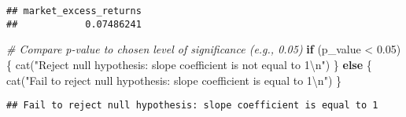 \documentclass[
]{article}
\newenvironment{Shaded}{\begin{snugshade}}{\end{snugshade}}
\newcommand{\CommentTok}[1]{\textcolor[rgb]{0.56,0.35,0.01}{\textit{#1}}}
\newcommand{\ControlFlowTok}[1]{\textcolor[rgb]{0.13,0.29,0.53}{\textbf{#1}}}
\newcommand{\DecValTok}[1]{\textcolor[rgb]{0.00,0.00,0.81}{#1}}
\newcommand{\FloatTok}[1]{\textcolor[rgb]{0.00,0.00,0.81}{#1}}
\newcommand{\FunctionTok}[1]{\textcolor[rgb]{0.00,0.00,0.00}{#1}}
\newcommand{\NormalTok}[1]{#1}
\newcommand{\OtherTok}[1]{\textcolor[rgb]{0.56,0.35,0.01}{#1}}
\newcommand{\SpecialCharTok}[1]{\textcolor[rgb]{0.00,0.00,0.00}{#1}}
\newcommand{\StringTok}[1]{\textcolor[rgb]{0.31,0.60,0.02}{#1}}
\begin{document}
\begin{Shaded}
\end{Shaded}

\begin{verbatim}
## market_excess_returns 
##            0.07486241
\end{verbatim}

\begin{Shaded}
\begin{Highlighting}[]
\CommentTok{\# Compare p{-}value to chosen level of significance (e.g., 0.05)}
\ControlFlowTok{if}\NormalTok{ (p\_value }\SpecialCharTok{\textless{}} \FloatTok{0.05}\NormalTok{) \{}
  \FunctionTok{cat}\NormalTok{(}\StringTok{"Reject null hypothesis: slope coefficient is not equal to 1}\SpecialCharTok{\textbackslash{}n}\StringTok{"}\NormalTok{)}
\NormalTok{\} }\ControlFlowTok{else}\NormalTok{ \{}
  \FunctionTok{cat}\NormalTok{(}\StringTok{"Fail to reject null hypothesis: slope coefficient is equal to 1}\SpecialCharTok{\textbackslash{}n}\StringTok{"}\NormalTok{)}
\NormalTok{\}}
\end{Highlighting}
\end{Shaded}

\begin{verbatim}
## Fail to reject null hypothesis: slope coefficient is equal to 1
\end{verbatim}
\end{document}

